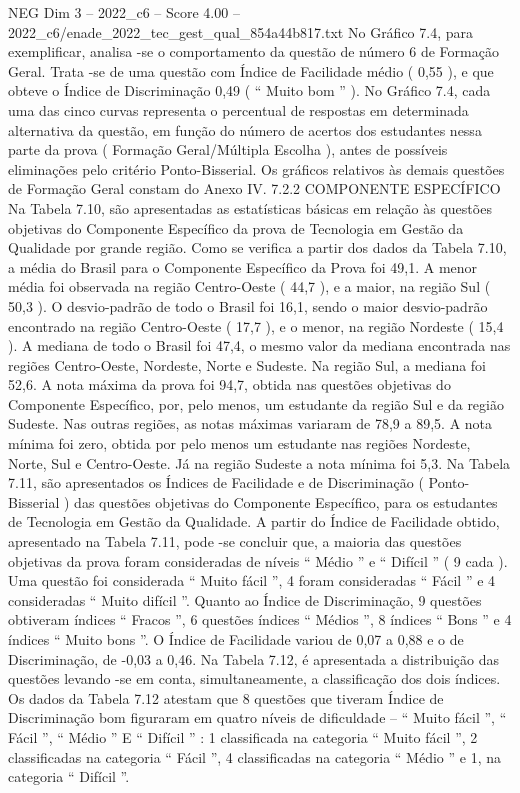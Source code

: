 \begin{textsample}{NEG Dim 3 – 2022\_c6 – Score 4.00 – 2022\_c6/enade\_2022\_tec\_gest\_qual\_854a44b817.txt}
No Gráfico 7.4, para exemplificar, analisa -se o comportamento da questão de número 6 de Formação Geral.
Trata -se de uma questão com Índice de Facilidade médio ( 0,55 ), e que obteve o Índice de Discriminação 0,49 ( “ Muito bom ” ).
No Gráfico 7.4, cada uma das cinco curvas representa o percentual de respostas em determinada alternativa da questão, em função do número de acertos dos estudantes nessa parte da prova ( Formação Geral/Múltipla Escolha ), antes de possíveis eliminações pelo critério Ponto-Bisserial.
Os gráficos relativos às demais questões de Formação Geral constam do Anexo IV. 7.2.2 COMPONENTE ESPECÍFICO Na Tabela 7.10, são apresentadas as estatísticas básicas em relação às questões objetivas do Componente Específico da prova de Tecnologia em Gestão da Qualidade por grande região.
Como se verifica a partir dos dados da Tabela 7.10, a média do Brasil para o Componente Específico da Prova foi 49,1.
A menor média foi observada na região Centro-Oeste ( 44,7 ), e a maior, na região Sul ( 50,3 ).
O desvio-padrão de todo o Brasil foi 16,1, sendo o maior desvio-padrão encontrado na região Centro-Oeste ( 17,7 ), e o menor, na região Nordeste ( 15,4 ).
A mediana de todo o Brasil foi 47,4, o mesmo valor da mediana encontrada nas regiões Centro-Oeste, Nordeste, Norte e Sudeste.
Na região Sul, a mediana foi 52,6.
A nota máxima da prova foi 94,7, obtida nas questões objetivas do Componente Específico, por, pelo menos, um estudante da região Sul e da região Sudeste.
Nas outras regiões, as notas máximas variaram de 78,9 a 89,5.
A nota mínima foi zero, obtida por pelo menos um estudante nas regiões Nordeste, Norte, Sul e Centro-Oeste.
Já na região Sudeste a nota mínima foi 5,3.
Na Tabela 7.11, são apresentados os Índices de Facilidade e de Discriminação ( Ponto-Bisserial ) das questões objetivas do Componente Específico, para os estudantes de Tecnologia em Gestão da Qualidade.
A partir do Índice de Facilidade obtido, apresentado na Tabela 7.11, pode -se concluir que, a maioria das questões objetivas da prova foram consideradas de níveis “ Médio ” e “ Difícil ” ( 9 cada ).
Uma questão foi considerada “ Muito fácil ”, 4 foram consideradas “ Fácil ” e 4 consideradas “ Muito difícil ”.
Quanto ao Índice de Discriminação, 9 questões obtiveram índices “ Fracos ”, 6 questões índices “ Médios ”, 8 índices “ Bons ” e 4 índices “ Muito bons ”.
O Índice de Facilidade variou de 0,07 a 0,88 e o de Discriminação, de -0,03 a 0,46.
Na Tabela 7.12, é apresentada a distribuição das questões levando -se em conta, simultaneamente, a classificação dos dois índices.
Os dados da Tabela 7.12 atestam que 8 questões que tiveram Índice de Discriminação bom figuraram em quatro níveis de dificuldade – “ Muito fácil ”, “ Fácil ”, “ Médio ” E “ Difícil ” : 1 classificada na categoria “ Muito fácil ”, 2 classificadas na categoria “ Fácil ”, 4 classificadas na categoria “ Médio ” e 1, na categoria “ Difícil ”.

\end{textsample}
